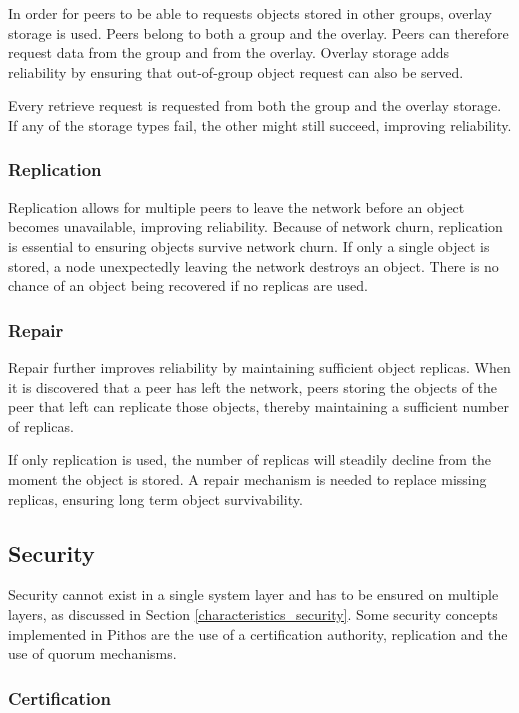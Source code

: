 In order for peers to be able to requests objects stored in other groups, overlay storage is used. Peers belong to both a group and the overlay. Peers can therefore request data from the group and from the overlay. Overlay storage adds reliability by ensuring that out-of-group object request can also be served.

Every retrieve request is requested from both the group and the overlay storage. If any of the storage types fail, the other might still succeed, improving reliability.

\subsubsection{Replication}

Replication allows for multiple peers to leave the network before an object becomes unavailable, improving reliability. Because of network churn, replication is essential to ensuring objects survive network churn. If only a single object is stored, a node unexpectedly leaving the network destroys an object. There is no chance of an object being recovered if no replicas are used.

\subsubsection{Repair}

Repair further improves reliability by maintaining sufficient object replicas. When it is discovered that a peer has left the network, peers storing the objects of the peer that left can replicate those objects, thereby maintaining a sufficient number of replicas.

If only replication is used, the number of replicas will steadily decline from the moment the object is stored. A repair mechanism is needed to replace missing replicas, ensuring long term object survivability.

\subsection{Security}

Security cannot exist in a single system layer and has to be ensured on multiple layers, as discussed in Section \ref{characteristics_security}. Some security concepts implemented in Pithos are the use of a certification authority, replication and the use of quorum mechanisms.

\subsubsection{Certification}


